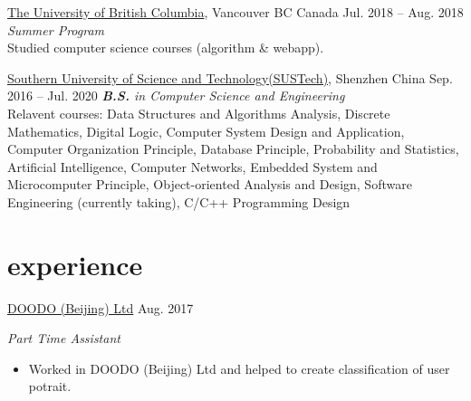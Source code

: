 \documentclass[hidelinks__VERSION__]{adamyi-cv}
\begin{document}
\begin{entrylist}


\entry
{\href{https://www.ubc.ca/}{The University of British Columbia}, Vancouver BC Canada}
{Jul. 2018 -- Aug. 2018}
{\emph{Summer Program}\\
Studied computer science courses (algorithm \& webapp).
}


\entry
{\href{https://www.sustech.edu.cn/}{Southern University of Science and Technology(SUSTech)}, Shenzhen China}
{Sep. 2016 -- Jul. 2020}
{\emph{\textbf{B.S.} in Computer Science and Engineering}\\
Relavent courses: Data Structures and Algorithms Analysis, Discrete Mathematics, Digital Logic, Computer System Design and Application, Computer Organization Principle, Database Principle, Probability and Statistics, Artificial Intelligence, Computer Networks, Embedded System and Microcomputer Principle, Object-oriented Analysis and Design, Software Engineering (currently taking), C/C++ Programming Design
}

\end{entrylist}


\section{experience}

\begin{entrylist}


\entry
{\href{http://www.doodod.com/}{DOODO (Beijing) Ltd}}
{Aug. 2017}
{\emph{Part Time Assistant}
\begin{itemize}
\item Worked in DOODO (Beijing) Ltd and helped to create classification of user potrait.
\end{itemize}}


\end{entrylist}

\end{document}
